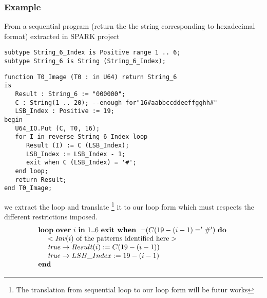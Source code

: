 \documentclass[a4paper,10pt]{article}
\newcommand{\idx}{\ensuremath{i}\xspace}
\newcommand{\KWloop}{\ensuremath{\mathrm{\textbf{loop}}~}}
\newcommand{\KWdo}{\ensuremath{\mathrm{\textbf{do}}~}}
\newcommand{\KWend}{\ensuremath{\mathrm{\textbf{end}}~}}
\newcommand{\KWover}{\ensuremath{\mathrm{\textbf{over}}~}}
\newcommand{\KWin}{\ensuremath{~\mathrm{\textbf{in}}~}}
\newcommand{\KWexit}{\ensuremath{\mathrm{\textbf{exit when}}~}}
\newcommand{\Inv}[1]{\ensuremath{\mathit{Inv}(#1)\xspace}}
\begin{document}
\subsubsection*{Example}
From a sequential program (return the the string corresponding to hexadecimal format) 
extracted in SPARK project ~\cite{sparkskein:url} 
\begin{lstlisting}
subtype String_6_Index is Positive range 1 .. 6;
subtype String_6 is String (String_6_Index);
\end{lstlisting}

\begin{lstlisting}
function T0_Image (T0 : in U64) return String_6
is
   Result : String_6 := "000000";
   C : String(1 .. 20); --enough for"16#aabbccddeeffgghh#"
   LSB_Index : Positive := 19;
begin
   U64_IO.Put (C, T0, 16);
   for I in reverse String_6_Index loop
      Result (I) := C (LSB_Index);
      LSB_Index := LSB_Index - 1;
      exit when C (LSB_Index) = '#';
   end loop;
   return Result;
end T0_Image;
\end{lstlisting}

we extract the loop and translate \footnote{The translation from sequential loop to our 
loop form will be futur works} it to our loop form which must respects the different 
restrictions imposed.
$$\begin{array}{l}
  \KWloop \KWover \idx \KWin 1 .. 6 ~ \KWexit ~ \neg (C (19-(\idx-1) = '\#') ~ \KWdo \\
  ~~~~ < \textrm{\Inv{\idx} of the patterns identified here} >\\
  ~~~~ \mathit{true} \rightarrow Result (\idx) := C (19-(\idx-1))\\
  ~~~~ \mathit{true} \rightarrow LSB\_Index := 19 - (\idx-1)\\
  \KWend
\end{array}$$
\fi



\end{document}

